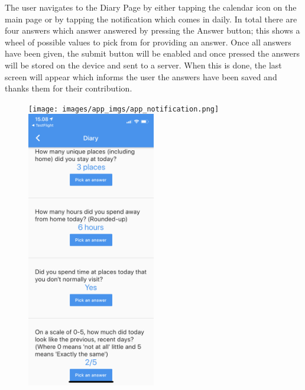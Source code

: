 The user navigates to the Diary Page by either tapping the calendar icon on the main page or by tapping the notification which comes in daily. In total there are four answers which answer answered by pressing the Answer button; this shows a wheel of possible values to pick from for providing an answer. Once all answers have been given, the submit button will be enabled and once pressed the answers will be stored on the device and sent to a server. When this is done, the last screen will appear which informs the user the answers have been saved and thanks them for their contribution.

\begin{figure}
    \centering
    \texttt{[image: images/app\_imgs/app\_notification.png]}
    \includegraphics[width=0.5\textwidth]{images/app_imgs/app_noanswers.png}

\end{figure}

